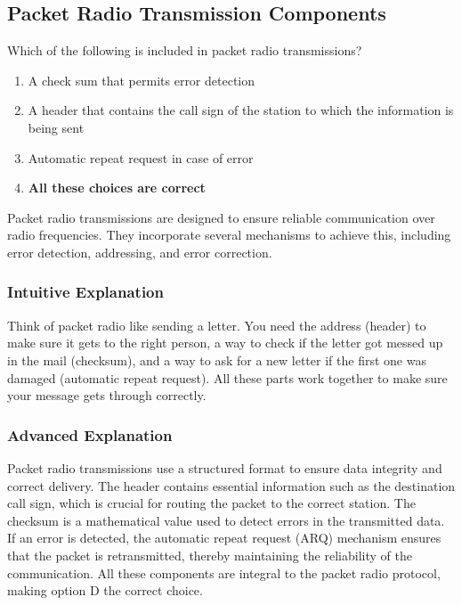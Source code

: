 \subsection{Packet Radio Transmission Components}
\label{T8D08}

\begin{tcolorbox}[colback=gray!10!white,colframe=black!75!black,title=T8D08]
Which of the following is included in packet radio transmissions?
\begin{enumerate}[noitemsep]
    \item A check sum that permits error detection
    \item A header that contains the call sign of the station to which the information is being sent
    \item Automatic repeat request in case of error
    \item \textbf{All these choices are correct}
\end{enumerate}
\end{tcolorbox}

Packet radio transmissions are designed to ensure reliable communication over radio frequencies. They incorporate several mechanisms to achieve this, including error detection, addressing, and error correction. 

\subsubsection*{Intuitive Explanation}
Think of packet radio like sending a letter. You need the address (header) to make sure it gets to the right person, a way to check if the letter got messed up in the mail (checksum), and a way to ask for a new letter if the first one was damaged (automatic repeat request). All these parts work together to make sure your message gets through correctly.

\subsubsection*{Advanced Explanation}
Packet radio transmissions use a structured format to ensure data integrity and correct delivery. The header contains essential information such as the destination call sign, which is crucial for routing the packet to the correct station. The checksum is a mathematical value used to detect errors in the transmitted data. If an error is detected, the automatic repeat request (ARQ) mechanism ensures that the packet is retransmitted, thereby maintaining the reliability of the communication. All these components are integral to the packet radio protocol, making option D the correct choice.